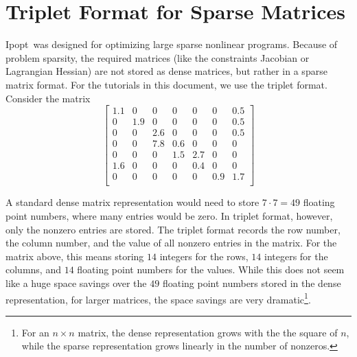 \documentclass[10pt]{article}
\newcommand{\Ipopt}{{\sc Ipopt}}
\begin{document}
\appendix
\newpage
\section{Triplet Format for Sparse Matrices}\label{app.triplet}
\Ipopt\ was designed for optimizing large sparse nonlinear programs.
Because of problem sparsity, the required matrices (like the
constraints Jacobian or Lagrangian Hessian) are not stored as dense
matrices, but rather in a sparse matrix format. For the tutorials in
this document, we use the triplet format.  Consider the matrix
\begin{equation}
\label{eqn.ex_matrix}
\left[
\begin{array}{ccccccc}
1.1     & 0             & 0             & 0             & 0             & 0             & 0.5 \\
0       & 1.9   & 0             & 0             & 0             & 0             & 0.5 \\
0       & 0             & 2.6   & 0             & 0             & 0             & 0.5 \\
0       & 0             & 7.8   & 0.6   & 0             & 0             & 0    \\
0       & 0             & 0             & 1.5   & 2.7   & 0             & 0     \\
1.6     & 0             & 0             & 0             & 0.4   & 0             & 0     \\
0       & 0             & 0             & 0             & 0             & 0.9   & 1.7 \\
\end{array}
\right]
\end{equation}

A standard dense matrix representation would need to store $7 \cdot
7{=} 49$ floating point numbers, where many entries would be zero. In
triplet format, however, only the nonzero entries are stored. The
triplet format records the row number, the column number, and the
value of all nonzero entries in the matrix. For the matrix above, this
means storing $14$ integers for the rows, $14$ integers for the
columns, and $14$ floating point numbers for the values. While this
does not seem like a huge space savings over the $49$ floating point
numbers stored in the dense representation, for larger matrices, the
space savings are very dramatic\footnote{For an $n \times n$ matrix,
the dense representation grows with the the square of $n$, while the
sparse representation grows linearly in the number of nonzeros.}.
\end{document}
